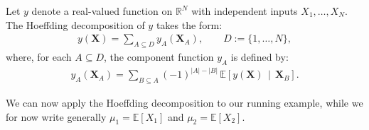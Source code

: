 \begin{definition}\label{def:hoeffding_decomposition}
Let $y$ denote a real-valued function on $\mathbb{R}^N$ with independent inputs $X_1, \dots, X_N$. The Hoeffding decomposition of $y$ takes the form:
\begin{align}
    y(\boldsymbol{X})
=
\sum_{A \subseteq D} 
y_A(\boldsymbol{X}_A),
\qquad
D := \{1,\dots,N\},
\end{align}
where, for each $A \subseteq D$, the component function $y_A$ is defined by:
\begin{align}\label{eq:hoeffding_components}
    y_A(\boldsymbol{X}_A)
=
\sum_{B \subseteq A}
(-1)^{|A|-|B|}
\,\mathbb{E}\!\left[
  y(\boldsymbol{X}) 
  \,\middle|\, 
  \boldsymbol{X}_B
\right].
\end{align}
\end{definition}

We can now apply the Hoeffding decomposition to our running example, while we for now write generally $\mu_1 = \mathbb{E}[X_1]$ and $\mu_2 = \mathbb{E}[X_2]$.

